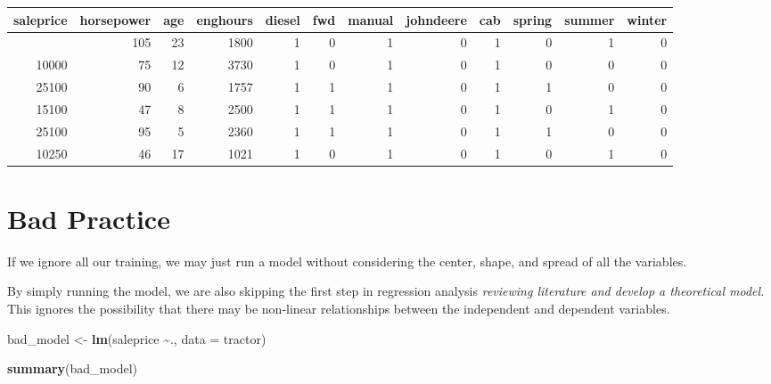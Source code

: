 \documentclass[
]{article}
\newenvironment{Shaded}{\begin{snugshade}}{\end{snugshade}}
\newcommand{\AttributeTok}[1]{\textcolor[rgb]{0.13,0.29,0.53}{#1}}
\newcommand{\FunctionTok}[1]{\textcolor[rgb]{0.13,0.29,0.53}{\textbf{#1}}}
\newcommand{\NormalTok}[1]{#1}
\newcommand{\OtherTok}[1]{\textcolor[rgb]{0.56,0.35,0.01}{#1}}
\newcommand{\SpecialCharTok}[1]{\textcolor[rgb]{0.81,0.36,0.00}{\textbf{#1}}}
\begin{document}
\begingroup
\fontsize{12.0pt}{14.4pt}\selectfont
\begin{longtable}{rrrrrrrrrrrr}
\toprule
saleprice & horsepower & age & enghours & diesel & fwd & manual & johndeere & cab & spring & summer & winter \\ 
\midrule\addlinespace[2.5pt]
16100 & 105 & 23 & 1800 & 1 & 0 & 1 & 0 & 1 & 0 & 1 & 0 \\ 
10000 & 75 & 12 & 3730 & 1 & 0 & 1 & 0 & 1 & 0 & 0 & 0 \\ 
25100 & 90 & 6 & 1757 & 1 & 1 & 1 & 0 & 1 & 1 & 0 & 0 \\ 
15100 & 47 & 8 & 2500 & 1 & 1 & 1 & 0 & 1 & 0 & 1 & 0 \\ 
25100 & 95 & 5 & 2360 & 1 & 1 & 1 & 0 & 1 & 1 & 0 & 0 \\ 
10250 & 46 & 17 & 1021 & 1 & 0 & 1 & 0 & 1 & 0 & 1 & 0 \\ 
\bottomrule
\end{longtable}
\endgroup

\section{Bad Practice}\label{bad-practice}

If we ignore all our training, we may just run a model without
considering the center, shape, and spread of all the variables.

By simply running the model, we are also skipping the first step in
regression analysis \emph{reviewing literature and develop a theoretical
model.} This ignores the possibility that there may be non-linear
relationships between the independent and dependent variables.

\begin{Shaded}
\begin{Highlighting}[]
\NormalTok{bad\_model }\OtherTok{\textless{}{-}} \FunctionTok{lm}\NormalTok{(saleprice }\SpecialCharTok{\textasciitilde{}}\NormalTok{., }\AttributeTok{data =}\NormalTok{ tractor)}

\FunctionTok{summary}\NormalTok{(bad\_model)}
\end{Highlighting}
\end{Shaded}
\end{document}
